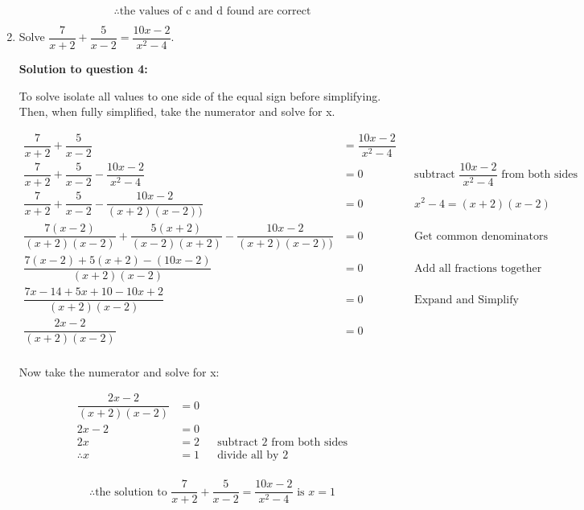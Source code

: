 \documentclass[12pt]{book}
\begin{document}
\begin{enumerate}
\vspace{-1cm}
$$\therefore \text{the values of c and d found are correct}$$

\newpage

\item Solve $\dfrac{7}{x+2} + \dfrac{5}{x-2} = \dfrac{10x-2}{x^2 - 4}$.

\vspace{0.5cm} 
\textbf{Solution to question 4:}

\vspace{0.3cm} 
To solve isolate all values to one side of the equal sign before simplifying. Then, when fully simplified, take the numerator and solve for x.

\begin{align*}
    \dfrac{7}{x+2} + \dfrac{5}{x-2} &= \dfrac{10x-2}{x^2 - 4} \\
    \dfrac{7}{x+2} + \dfrac{5}{x-2} - \dfrac{10x-2}{x^2 - 4} &= 0 && \text{subtract } \dfrac{10x-2}{x^2 - 4} \text{ from both sides}\\
    \dfrac{7}{x+2} + \dfrac{5}{x-2} - \dfrac{10x-2}{(x+2)(x-2))} &= 0 && x^2-4 = (x+2)(x-2)\\
    \dfrac{7(x-2)}{(x+2)(x-2)} + \dfrac{5(x+2)}{(x-2)(x+2)} - \dfrac{10x-2}{(x+2)(x-2))} &= 0 && \text{Get common denominators} \\
    \dfrac{7(x-2)+5(x+2)-(10x-2)}{(x+2)(x-2)} &= 0 && \text{Add all fractions together}\\
    \dfrac{7x-14+5x+10-10x+2}{(x+2)(x-2)} &= 0 && \text{Expand and Simplify}\\
    \dfrac{2x-2}{(x+2)(x-2)} &= 0\\
\end{align*}

\vspace{-0.8cm} 
Now take the numerator and solve for x:
\vspace{-0.2cm} 

\begin{align*}
    \dfrac{2x-2}{(x+2)(x-2)} &= 0\\
    2x-2 &= 0\\
    2x &= 2 && \text{subtract 2 from both sides}\\
    \therefore x &= 1 && \text{divide all by 2}\\
\end{align*}

\vspace{-1cm} 
$$\boxed{\therefore \text{the solution to } \dfrac{7}{x+2} + \dfrac{5}{x-2} = \dfrac{10x-2}{x^2 - 4} \text{ is } x = 1}$$


\end{enumerate}
\end{document}
